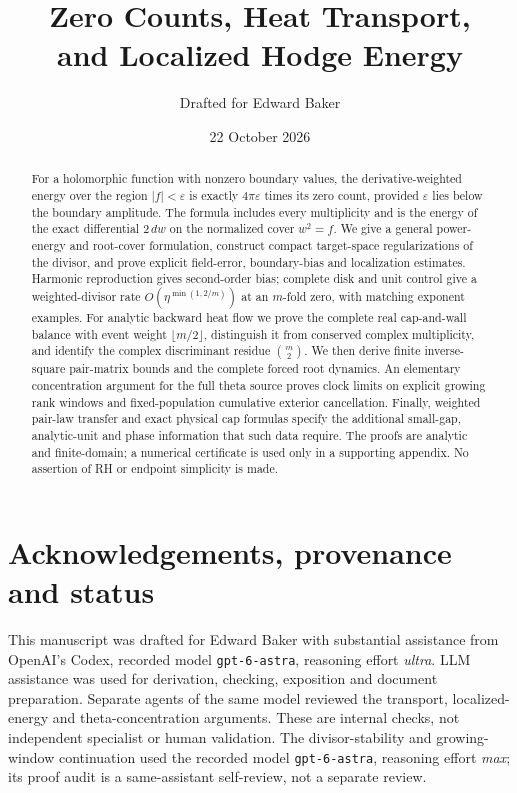 \documentclass[11pt,letterpaper]{article}
\title{Zero Counts, Heat Transport,\\and Localized Hodge Energy}
\author{Drafted for Edward Baker}
\date{22 October 2026}
\numberwithin{equation}{section}
\theoremstyle{definition}
\theoremstyle{remark}
\begin{document}
\maketitle
\begin{abstract}
For a holomorphic function with nonzero boundary values, the
derivative-weighted energy over the region $|f|<\varepsilon$ is exactly
$4\pi\varepsilon$ times its zero count, provided $\varepsilon$ lies below
the boundary amplitude. The formula includes every multiplicity and is
the energy of the exact differential $2\,dw$ on the normalized cover
$w^2=f$. We give a general power-energy and root-cover formulation,
construct compact target-space regularizations of the divisor, and prove
explicit field-error, boundary-bias and localization estimates. Harmonic
reproduction gives second-order bias; complete disk and unit control
give a weighted-divisor rate $O(\eta^{\min(1,2/m)})$ at an
$m$-fold zero, with matching exponent examples.
For analytic backward heat flow we prove the complete real cap-and-wall
balance with event weight $\lfloor m/2\rfloor$, distinguish it from
conserved complex multiplicity, and identify the complex discriminant
residue $\binom m2$. We then derive finite inverse-square pair-matrix
bounds and the complete forced root dynamics. An elementary concentration
argument for the full theta source proves clock limits on explicit
growing rank windows and fixed-population cumulative exterior cancellation. Finally, weighted pair-law
transfer and exact physical cap formulas specify the additional
small-gap, analytic-unit and phase information that such data require.
The proofs are analytic and finite-domain; a numerical certificate is
used only in a supporting appendix. No assertion of RH or endpoint
simplicity is made.
\end{abstract}
\tableofcontents









\appendix

\section*{Acknowledgements, provenance and status}
This manuscript was drafted for Edward Baker with substantial assistance
from OpenAI's Codex, recorded model \texttt{gpt-6-astra}, reasoning effort
\emph{ultra}. LLM assistance was used for derivation, checking, exposition
and document preparation. Separate agents of the same model reviewed the
transport, localized-energy and theta-concentration arguments. These are
internal checks, not independent specialist or human validation.
The divisor-stability and growing-window continuation used the recorded
model \texttt{gpt-6-astra}, reasoning effort \emph{max}; its proof
audit is a same-assistant self-review, not a separate review.
\end{document}

